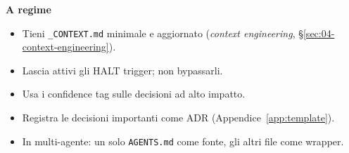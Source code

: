 \textbf{A regime}
\begin{itemize}
  \item[$\square$] Tieni \texttt{\_CONTEXT.md} minimale e aggiornato (\textit{context engineering}, §\ref{sec:04-context-engineering}).
  \item[$\square$] Lascia attivi gli HALT trigger; non bypassarli.
  \item[$\square$] Usa i confidence tag sulle decisioni ad alto impatto.
  \item[$\square$] Registra le decisioni importanti come ADR (Appendice~\ref{app:template}).
  \item[$\square$] In multi-agente: un solo \texttt{AGENTS.md} come fonte, gli altri file come wrapper.
\end{itemize}
